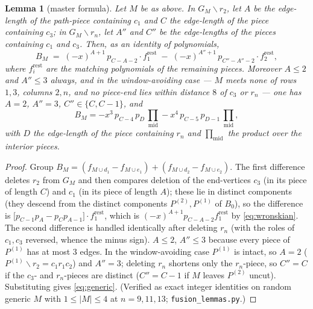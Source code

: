 \documentclass[11pt]{article}
\newtheorem{lemma}[theorem]{Lemma}
\theoremstyle{definition}
\begin{document}
\begin{lemma}[master formula]\label{lem:master}
Let $M$ be as above.  In $G_M\smallsetminus r_2$, let $A$ be the edge-length
of the path-piece containing $c_1$ and $C$ the edge-length of the piece
containing $c_3$; in $G_M\smallsetminus r_n$, let $A''$ and $C''$ be the
edge-lengths of the pieces containing $c_1$ and $c_3$.  Then, as an
identity of polynomials,
\begin{equation}\label{eq:master}
B_M\;=\;(-x)^{A+1}\,p_{C-A-2}\cdot f^{\mathrm{rest}}_1
\;-\;(-x)^{A''+1}\,p_{C''-A''-2}\cdot f^{\mathrm{rest}}_2 ,
\end{equation}
where $f^{\mathrm{rest}}_i$ are the matching polynomials of the remaining
pieces.  Moreover $A\le 2$ and $A''\le3$ always, and in the
\emph{window-avoiding} case --- $M$ meets none of rows $1,3$, columns
$2,n$, and no piece-end lies within distance $8$ of $c_3$ or $r_n$ ---
one has $A=2$, $A''=3$, $C''\in\{C,C-1\}$, and
\begin{equation}\label{eq:generic}
B_M=-x^3\,p_{C-4}\,p_D\,\textstyle\prod_{\mathrm{mid}}
-x^4\,p_{C-5}\,p_{D-1}\,\prod_{\mathrm{mid}},
\end{equation}
with $D$ the edge-length of the piece containing $r_n$ and
$\prod_{\mathrm{mid}}$ the product over the interior pieces.
\end{lemma}

\begin{proof}
Group $B_M=(f_{M\cup d_1}-f_{M\cup e_1})+(f_{M\cup d_2}-f_{M\cup e_2})$.
The first difference deletes $r_2$ from $G_M$ and then compares deletion
of the end-vertices $c_3$ (in its piece of length $C$) and $c_1$ (in its
piece of length $A$); these lie in distinct components (they descend from
the distinct components $P^{(2)},P^{(1)}$ of $B_0$), so the difference is
$\bigl[p_{C-1}p_A-p_Cp_{A-1}\bigr]\cdot f^{\mathrm{rest}}_1$, which is
$(-x)^{A+1}p_{C-A-2}f^{\mathrm{rest}}_1$ by \eqref{eq:wronskian}.  The
second difference is handled identically after deleting $r_n$ (with the
roles of $c_1,c_3$ reversed, whence the minus sign).  $A\le2$, $A''\le3$
because every piece of $P^{(1)}$ has at most $3$ edges.  In the
window-avoiding case $P^{(1)}$ is intact, so $A=2$ ($P^{(1)}\smallsetminus
r_2=c_1r_1c_2$) and $A''=3$; deleting $r_n$ shortens only the
$r_n$-piece, so $C''=C$ if the $c_3$- and $r_n$-pieces are distinct
($C''=C-1$ if $M$ leaves $P^{(2)}$ uncut).  Substituting gives
\eqref{eq:generic}.  (Verified as exact integer identities on random
generic $M$ with $1\le|M|\le4$ at $n=9,11,13$;
\texttt{fusion\_lemmas.py}.)
\end{proof}
\end{document}
